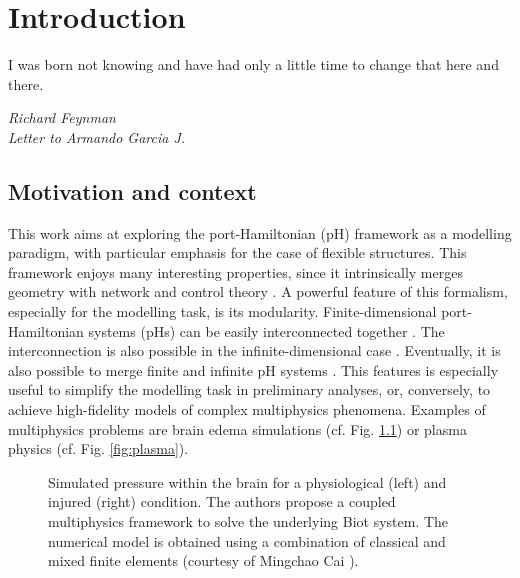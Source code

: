 \chapter[Introduction]{Introduction}

\epigraph{I was born not knowing and have had only a little time to change that here and there.}
{\textit{Richard Feynman \\ Letter to Armando Garcia J.}}


\minitoc

\section{Motivation and context}

This work aims at exploring the port-Hamiltonian (pH) framework as a modelling paradigm, with particular emphasis for the case of flexible structures. This framework enjoys many interesting properties, since it intrinsically merges geometry with network and control theory \cite{vanderschaft2006book}. A powerful feature of this formalism, especially for the modelling task, is its modularity. Finite-dimensional port-Hamiltonian systems (pHs) can be easily interconnected together \cite{cervera2007interconnection}. The interconnection is also possible in the infinite-dimensional case \cite{kurula2010,augner2020int}. Eventually, it is also possible to merge finite and infinite pH systems \cite{pasumarthy2006}. This features is especially useful to simplify the modelling task in preliminary analyses, or, conversely, to achieve high-fidelity models of complex multiphysics phenomena. Examples of multiphysics problems are brain edema simulations \cite{ju2020brain} (cf. Fig. \ref{fig:p_brain}) or plasma physics \cite{nattila2019runko} (cf. Fig. \ref{fig:plasma}). \\



\begin{figure}[htbp]%
	\centering
	\hspace{8pt}%
	\caption[]{Simulated pressure within the brain for a physiological (left) and injured (right) condition. The authors propose a coupled multiphysics framework to solve the underlying Biot system. The numerical model is obtained using a combination of classical and mixed finite elements (courtesy of Mingchao Cai \cite{ju2020brain}).}%
	\label{fig:p_brain}%
\end{figure}

